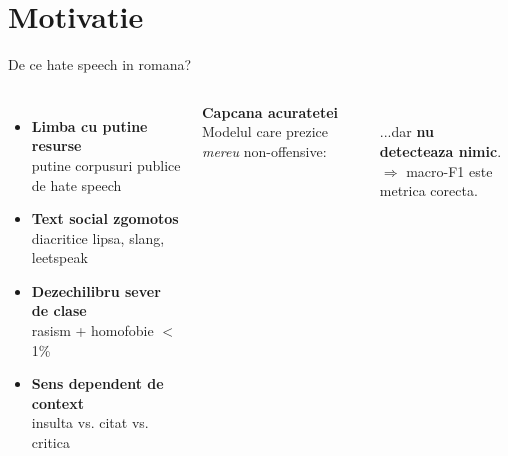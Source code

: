 \documentclass[10pt,aspectratio=169]{beamer}
\newcommand{\sub}[1]{{\small\textcolor{ubdark!70}{#1}}}
\begin{document}
\section{Motivatie}

\begin{frame}{De ce hate speech in romana?}
\begin{columns}[T,onlytextwidth]
\begin{itemize}
  \setlength\itemsep{0.7em}
  \item \textbf{Limba cu putine resurse} \\ \sub{putine corpusuri publice de hate speech}
  \item \textbf{Text social zgomotos} \\ \sub{diacritice lipsa, slang, leetspeak}
  \item \textbf{Dezechilibru sever de clase} \\ \sub{rasism + homofobie $<$ 1\%}
  \item \textbf{Sens dependent de context} \\ \sub{insulta vs. citat vs. critica}
\end{itemize}
\centering
\textbf{Capcana acuratetei}\\[0.3em]
\sub{Modelul care prezice \emph{mereu} non-offensive:}\\[0.4em]

\\[0.3em]
\sub{...dar \textbf{nu detecteaza nimic}.}\\[0.6em]
\alert{$\Rightarrow$ macro-F1 este metrica corecta.}
\end{columns}
\end{frame}
\end{document}
